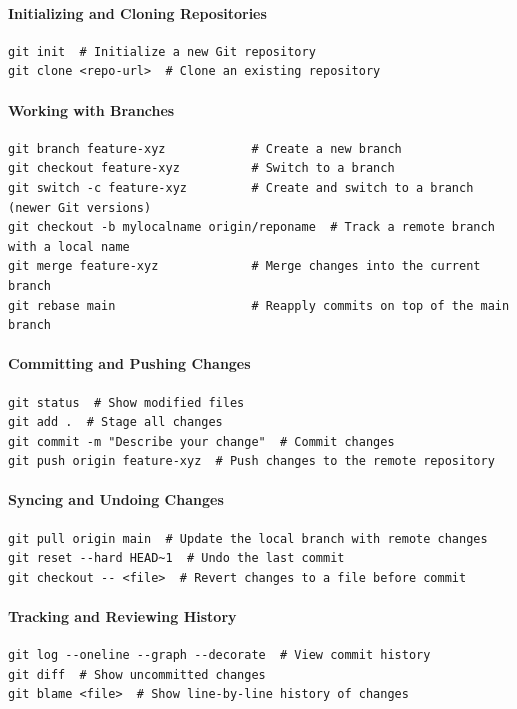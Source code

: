 \paragraph{Initializing and Cloning Repositories}
\begin{verbatim}
git init  # Initialize a new Git repository
git clone <repo-url>  # Clone an existing repository
\end{verbatim}

\paragraph{Working with Branches}
\begin{verbatim}
git branch feature-xyz            # Create a new branch
git checkout feature-xyz          # Switch to a branch
git switch -c feature-xyz         # Create and switch to a branch (newer Git versions)
git checkout -b mylocalname origin/reponame  # Track a remote branch with a local name
git merge feature-xyz             # Merge changes into the current branch
git rebase main                   # Reapply commits on top of the main branch
\end{verbatim}


\paragraph{Committing and Pushing Changes}
\begin{verbatim}
git status  # Show modified files
git add .  # Stage all changes
git commit -m "Describe your change"  # Commit changes
git push origin feature-xyz  # Push changes to the remote repository
\end{verbatim}

\paragraph{Syncing and Undoing Changes}
\begin{verbatim}
git pull origin main  # Update the local branch with remote changes
git reset --hard HEAD~1  # Undo the last commit
git checkout -- <file>  # Revert changes to a file before commit
\end{verbatim}

\paragraph{Tracking and Reviewing History}
\begin{verbatim}
git log --oneline --graph --decorate  # View commit history
git diff  # Show uncommitted changes
git blame <file>  # Show line-by-line history of changes
\end{verbatim}

